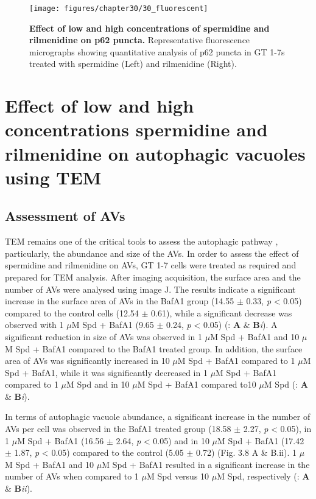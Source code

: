 {\begin{figure}[!htbp]
\center
  \texttt{[image: figures/chapter30/30\_fluorescent]}
  \caption[Effect of low and high concentrations of spermidine and rilmenidine on p62 puncta - fluorescence micrographs]{\textbf{Effect of low and high concentrations of spermidine and rilmenidine on p62 puncta.} Representative fluorescence micrographs showing quantitative analysis of p62 puncta in GT 1-7s treated with spermidine (Left) and rilmenidine (Right).}
  \label{fig:30_fluorescent}
\end{figure} 

\section{Effect of low and high concentrations spermidine and rilmenidine on autophagic vacuoles using TEM}
\subsection{Assessment of AVs}
TEM remains one of the critical tools to assess the autophagic pathway \citep{klionsky2016}, particularly, the abundance and size of the AVs.  In order to assess the effect of spermidine and rilmenidine on AVs, GT 1-7 cells were treated as required and prepared for TEM analysis. After imaging acquisition, the surface area and the number of AVs were analysed using image J. The results indicate a significant increase in the surface area of AVs in the BafA1 group (14.55 $\pm$ 0.33, \textit{p} < 0.05) compared to the control cells (12.54 $\pm$ 0.61), while a significant decrease was observed with 1 $\mu$M Spd + BafA1 (9.65 $\pm$ 0.24, \textit{p} < 0.05) (: \textbf{A} \& \textbf{B}\textit{i}).  A significant reduction in size of AVs was observed in 1 $\mu$M Spd + BafA1 and 10 $\mu$M Spd + BafA1 compared to the BafA1 treated group. In addition, the surface area of AVs was significantly increased in 10 $\mu$M Spd + BafA1 compared to 1 $\mu$M Spd + BafA1, while it was significantly decreased in 1 $\mu$M Spd + BafA1 compared to 1 $\mu$M Spd and in 10 $\mu$M Spd + BafA1 compared to10 $\mu$M Spd (: \textbf{A} \& \textbf{B}\textit{i}). 
 
In terms of autophagic vacuole abundance, a significant increase in the number of AVs per cell was observed in the BafA1 treated group (18.58 $\pm$ 2.27, \textit{p} < 0.05), in 1 $\mu$M Spd + BafA1 (16.56 $\pm$ 2.64, \textit{p} < 0.05) and in 10 $\mu$M Spd + BafA1 (17.42 $\pm$ 1.87, \textit{p} < 0.05) compared to the control (5.05 $\pm$ 0.72) (Fig. 3.8 A \& B.ii). 1 $\mu$M Spd + BafA1 and 10 $\mu$M Spd + BafA1 resulted in a significant increase in the number of AVs when compared to 1 $\mu$M Spd versus 10 $\mu$M Spd, respectively (: \textbf{A} \& \textbf{B}\textit{ii}).

}
